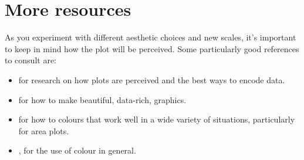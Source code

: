 \section{More resources}
\label{sec:scale_resources}

As you experiment with different aesthetic choices and new scales, it's important to keep in mind how the plot will be perceived.   Some particularly good references to consult are:

\begin{itemize}
  \item \citet{cleveland:1993,cleveland:1987,cleveland:1994} for research on how plots are perceived and the best ways to encode data.
  \item \citet{tufte:2006,tufte:1990,tufte:1997,tufte:2001} for how to make beautiful, data-rich, graphics.
  \item \citet{brewer:1994,brewer:1994a} for how to colours that work well in a wide variety of situations, particularly for area plots.
  \item \citet{carr:1999,carr:1994,carr:2002}, for the use of colour in general.
\end{itemize}


